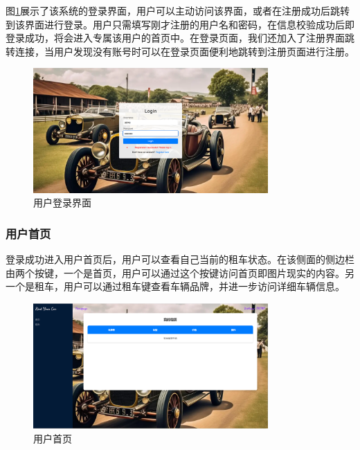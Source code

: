 \documentclass[UTF8,a4paper,12pt]{ctexart}
\begin{document}
图\ref{fig:log}展示了该系统的登录界面，用户可以主动访问该界面，或者在注册成功后跳转到该界面进行登录。用户只需填写刚才注册的用户名和密码，在信息校验成功后即登录成功，将会进入专属该用户的首页中。在登录页面，我们还加入了注册界面跳转连接，当用户发现没有账号时可以在登录页面便利地跳转到注册页面进行注册。
\begin{figure}[htbp]  %
    \centering  %
    \includegraphics[width=0.8\textwidth]{pic/log.png}
    \caption{用户登录界面}  %
    \label{fig:log}  %
\end{figure}

\subsubsection{用户首页}
登录成功进入用户首页后，用户可以查看自己当前的租车状态。在该侧面的侧边栏由两个按键，一个是首页，用户可以通过这个按键访问首页即图片现实的内容。另一个是租车，用户可以通过租车键查看车辆品牌，并进一步访问详细车辆信息。
\begin{figure}[htbp]  %
    \centering  %
    \includegraphics[width=0.8\textwidth]{pic/home.png}
    \caption{用户首页}  %
    \label{fig:home}  %
\end{figure}
\end{document}
